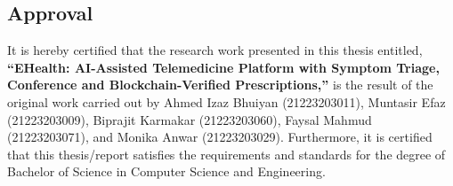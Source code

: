 \begin{center}
    \section*{Approval}
\end{center}

\noindent
\begin{sloppypar}
\noindent It is hereby certified that the research work presented in this thesis entitled, \textbf{``EHealth: AI-Assisted Telemedicine Platform with Symptom Triage, Conference and Blockchain-Verified Prescriptions,''} is the result of the original work carried out by Ahmed Izaz Bhuiyan (21223203011), Muntasir Efaz (21223203009), Biprajit Karmakar (21223203060), Faysal Mahmud (21223203071), and Monika Anwar (21223203029). Furthermore, it is certified that this thesis/report satisfies the requirements and standards for the degree of Bachelor of Science in Computer Science and Engineering.
\end{sloppypar}

\vspace{10mm}


